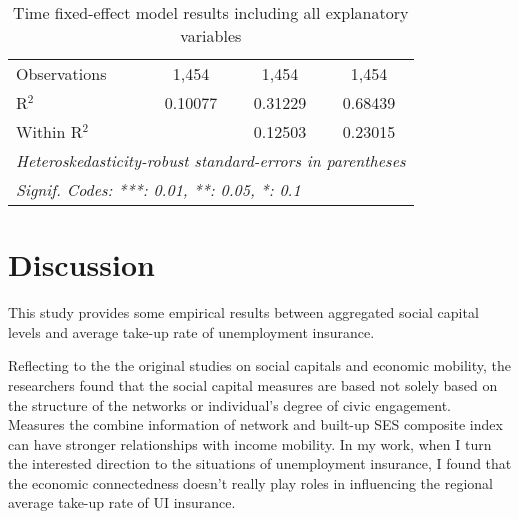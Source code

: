 \documentclass{article}
\begin{document}
\begin{table}[h!]
\begin{tabular}{lccc}
      Observations                 & 1,454          & 1,454          & 1,454\\  
      R$^2$                        & 0.10077        & 0.31229        & 0.68439\\  
      Within R$^2$                 &                & 0.12503        & 0.23015\\  
      \midrule \midrule
      \multicolumn{4}{l}{\emph{Heteroskedasticity-robust standard-errors in parentheses}}\\
      \multicolumn{4}{l}{\emph{Signif. Codes: ***: 0.01, **: 0.05, *: 0.1}}\\
   \end{tabular}
   \caption{Time fixed-effect model results including all explanatory variables}
   \label{result4}
\end{table}

\newpage
\section{Discussion}
This study provides some empirical results between aggregated social capital levels and average take-up rate of unemployment insurance. 

Reflecting to the the original studies on social capitals and economic mobility, the researchers found that the social capital measures are based not solely based on the structure of the networks or individual's degree of civic engagement. Measures the combine information of network and built-up SES composite index can have stronger relationships with income mobility. In my work, when I turn the interested direction to the situations of unemployment insurance, I found that the economic connectedness doesn't really play roles in influencing the regional average take-up rate of UI insurance. 
\end{document}
